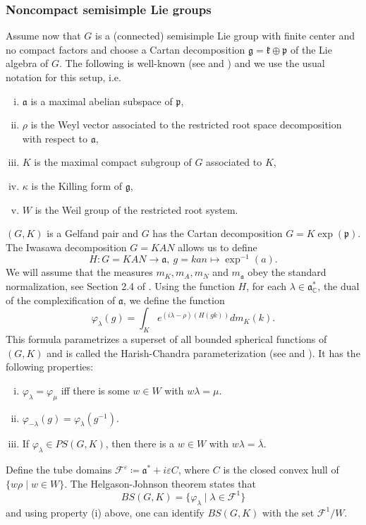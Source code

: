 \documentclass[12pt,reqno,a4paper]{amsart}
\theoremstyle{theorem}
\theoremstyle{definition}
\numberwithin{theorem}{section}
\numberwithin{equation}{section}
\newcommand{\C}{\mathbb{C}}
\begin{document}
\subsubsection{Noncompact semisimple Lie groups}\label{ss:noncompt_ss_Lie_harmonic}
Assume now that $G$ is a (connected) semisimple Lie group with finite center and no compact factors and choose a Cartan decomposition $\mathfrak{g} = \mathfrak{k}\oplus\mathfrak{p}$ of the Lie algebra of $G$. 
The following is well-known (see \cite{VaradarajanGangolli} and \cite{Knapp}) and we use the usual notation for this setup, i.e.
\begin{enumerate}[(i)]
	\item $\mathfrak{a}$ is a maximal abelian subspace of $\mathfrak{p}$,
	\item $\rho$ is the Weyl vector associated to the restricted root space decomposition with respect to $\mathfrak{a}$,
	\item $K$ is the maximal compact subgroup of $G$ associated to $K$,
	\item $\kappa$ is the Killing form of $\mathfrak{g}$,
	\item $W$ is the Weil group of the restricted root system.
\end{enumerate} 
$(G, K)$ is a Gelfand pair and $G$ has the Cartan decomposition $G=K\exp(\mathfrak{p})$. The Iwasawa decomposition $G=KAN$ allows us to define \[H:G=KAN\to \mathfrak{a},\ g=kan\mapsto \exp^{-1}(a).\]
We will assume that the measures $m_K, m_A, m_N$ and $m_\mathfrak{a}$ obey the standard normalization, see Section 2.4 of \cite{VaradarajanGangolli}. 
Using the function $H$, for each $\lambda\in \mathfrak{a}_\C^*$, the dual of the complexification of $\mathfrak{a}$, we define the function
\[\varphi_\lambda(g)=\int_Ke^{(i\lambda-\rho)(H(gk))}dm_K(k).\]
This formula parametrizes a superset of all bounded spherical functions of $(G,K)$ and is called the Harish-Chandra parameterization (see \cite{Helgason2} and \cite{VaradarajanGangolli}). It has the following properties:
\begin{enumerate}[(i)]
	\item $\varphi_\lambda = \varphi_\mu$ iff there is some $w\in W$ with $w\lambda = \mu$.
	\item $\varphi_{-\lambda}(g) = \varphi_\lambda(g^{-1})$.
	\item If $\varphi_\lambda\in PS(G, K)$, then there is a $w\in W$ with $w\lambda = \overline{\lambda}$.
\end{enumerate}
Define the tube domains $\mathscr{F}^\varepsilon\coloneqq \mathfrak{a}^*+i\varepsilon C$, where $C$ is the closed convex hull of $\{w\rho\mid w\in W\}$.
The Helgason-Johnson theorem states that
\[BS(G, K) = \{\varphi_\lambda\mid \lambda\in \mathscr{F}^1\}\]
and using property (i) above, one can identify $BS(G, K)$ with the set $\mathscr{F}^1/W$.
\end{document}
